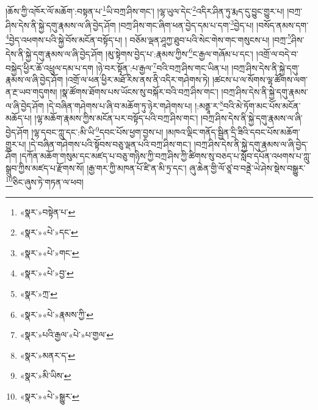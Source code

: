 །ཆོས་ཀྱི་འཁོར་ལོ་མཆོག་:བསྟན་པ་\footnote{«སྣར་»བསྟེན་པ་}ཡི་བཀྲ་ཤིས་གང་། །ལྷ་ཡུལ་དེང་\footnote{«སྣར་»«པེ་»དང་}འདིར་ཤིན་ཏུ་རྨད་དུ་བྱུང་གྱུར་པ། །བཀྲ་ཤིས་དེས་ནི་སྐྱེ་དགུ་རྣམས་ལ་ཞི་བྱེད་ཤོག །བཀྲ་ཤིས་གང་ཞིག་ཕན་བྱེད་དམ་པ་དག་\footnote{«སྣར་»«པེ་»གང་}བྱེད་པ། །བསོད་ནམས་དག་\footnote{«སྣར་»«པེ་»བྱ་}བྱེད་འཕགས་པའི་སྐྱེ་བོས་མངོན་བསྟོད་པ། །
བཅོམ་ལྡན་ཤཱཀྱ་ཐུབ་པའི་སེང་གེས་གང་གསུངས་པ། །བཀྲ་\footnote{«སྣར་»ཀྲ་}ཤིས་དེས་ནི་སྐྱེ་དགུ་རྣམས་ལ་ཞི་བྱེད་ཤོག །མུ་སྟེགས་བྱེད་པ་:རྣམས་ཀྱིས་\footnote{«སྣར་»«པེ་»རྣམས་ཀྱི་}ང་རྒྱལ་གཞོམ་པ་དང་། །འགྲོ་ལ་བདེ་བ་བསྐྱེད་ཕྱིར་ཆོ་འཕྲུལ་དམ་པ་དག །ཉེ་བར་སྟོན་:པ་རྒྱལ་\footnote{«སྣར་»པའི་རྒྱལ་«པེ་»པ་གྱལ་}བའི་བཀྲ་ཤིས་གང་ཡིན་པ། །བཀྲ་ཤིས་དེས་ནི་སྐྱེ་དགུ་རྣམས་ལ་ཞི་བྱེད་ཤོག །འགྲོ་ལ་ཕན་ཕྱིར་མཐོ་རིས་ནས་ནི་འདིར་གཤེགས་ཏེ། །ཚངས་པ་ལ་སོགས་ལྷ་ཚོགས་ལག་ན་རྔ་ཡབ་གདུགས། །སྣ་ཚོགས་ཐོགས་པས་ཡོངས་སུ་བསྐོར་བའི་བཀྲ་ཤིས་གང་། །བཀྲ་ཤིས་དེས་ནི་སྐྱེ་དགུ་རྣམས་ལ་ཞི་བྱེད་ཤོག །དེ་བཞིན་གཤེགས་པ་ཞི་བ་མཆོག་ཏུ་ཉེར་གཤེགས་པ། །:མནྡཱ་ར་\footnote{«སྣར་»མནར་ད་}བའི་མེ་ཏོག་མང་པོས་མངོན་མཆོད་པ། །ལྷ་མཆོག་རྣམས་ཀྱིས་མངོན་པར་བསྟོད་པའི་བཀྲ་ཤིས་གང་། །བཀྲ་ཤིས་དེས་ནི་སྐྱེ་དགུ་རྣམས་ལ་ཞི་བྱེད་ཤོག །ལྷ་དབང་ཀླུ་དང་:མི་ཡི་\footnote{«སྣར་»མི་ཡིས་}དབང་པོས་ཕྱག་བྱས་པ། །མཁའ་ལྡིང་གནོད་སྦྱིན་དྲི་ཟིའི་དབང་པོས་མཆོག་གྱུར་པ། །དེ་བཞིན་གཤེགས་པའི་སྟོབས་བཅུ་ལྡན་པའི་བཀྲ་ཤིས་གང་། །བཀྲ་ཤིས་དེས་ནི་སྐྱེ་དགུ་རྣམས་ལ་ཞི་བྱེད་ཤོག །དཀོན་མཆོག་གསུམ་དང་མཛད་པ་བཅུ་གཉིས་ཀྱི་བཀྲ་ཤིས་ཀྱི་ཚིགས་སུ་བཅད་པ་སློབ་དཔོན་འཕགས་པ་ཀླུ་སྒྲུབ་ཀྱིས་མཛད་པ་རྫོགས་སོ། །རྒྱ་གར་ཀྱི་མཁན་པོ་ཛི་ན་མི་ཏྲ་དང་། ཞུ་ཆེན་གྱི་ལོ་ཙཱ་བ་བནྡེ་ཡེ་ཤེས་སྡེས་བསྒྱུར་\footnote{«སྣར་»«པེ་»སྒྱུར་}ཅིང་ཞུས་ཏེ་གཏན་ལ་ཕབ། 